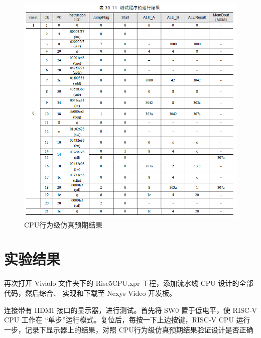 \documentclass[12pt,hyperref,a4paper,UTF8]{ctexart}
\begin{document}
    \begin{figure}[H]
        \centering
        \includegraphics[width=1\textwidth]{figures/fig/image1.png}
        \caption{CPU行为级仿真预期结果}
    \end{figure}
\newpage


\section{实验结果}

再次打开 Vivado 文件夹下的 Risc5CPU.xpr 工程，添加流水线 CPU 设计的全部代码，然后综合、
实现和下载至 Nexys Video 开发板。

连接带有 HDMI 接口的显示器，进行测试。首先将 SW0 置于低电平，使 RISC-V CPU 工作在
“单步”运行模式。复位后，每按一下上边按键，RISC-V CPU 运行一步，记录下显示器上的结果，对照
CPU行为级仿真预期结果验证设计是否正确
\end{document}
